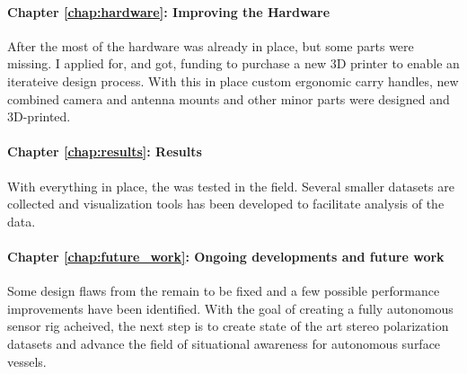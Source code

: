 \paragraph{Chapter \ref{chap:hardware}: Improving the Hardware}
After the \preproject most of the hardware was already in place, but some parts were missing.
I applied for, and got, funding to purchase a new 3D printer to enable an iterateive design process.
With this in place custom ergonomic carry handles, new combined camera and antenna mounts and other minor parts were designed and 3D-printed.

\paragraph{Chapter \ref{chap:results}: Results}
With everything in place, the \sr was tested in the field.
Several smaller datasets are collected and visualization tools has been developed to facilitate analysis of the data.

\paragraph{Chapter \ref{chap:future_work}: Ongoing developments and future work}
Some design flaws from the \preproject remain to be fixed and a few possible performance improvements have been identified.
With the goal of creating a fully autonomous sensor rig acheived, the next step is to create state of the art stereo polarization datasets and advance the field of situational awareness for autonomous surface vessels.